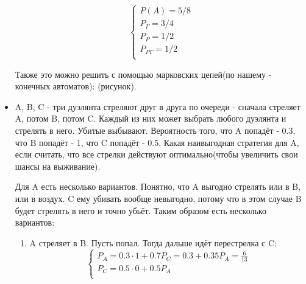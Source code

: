 \begin{itemize}
	\begin{equation*}
		\begin{cases}
			P(A) = 5/8 \\
			P_{\Gamma} = 3/4 \\
			P_P = 1/2 \\
			P_{P\Gamma} = 1/2 \\
		\end{cases}
	\end{equation*}
	
	Также это можно решить с помощью марковских цепей(по нашему - конечных автоматов): (рисунок).
	
	\item A, B, C - три дуэлянта стреляют друг в друга по очереди - сначала стреляет A, потом B, потом C. Каждый из них может выбрать любого дуэлянта и стрелять в него. Убитые выбывают. Вероятность того, что A попадёт - 0.3, что B попадёт - 1, что C попадёт - 0.5. Какая наивыгодная стратегия для A, если считать, что все стрелки действуют оптимально(чтобы увеличить свои шансы на выживание).
	
	Для A есть несколько вариантов. Понятно, что A выгодно стрелять или в B, или в воздух. C ему убивать вообще невыгодно, потому что в этом случае B будет стрелять в него и точно убьёт. Таким образом есть несколько вариантов:
	
	\begin{enumerate}
		\item A стреляет в B. Пусть попал. Тогда дальше идёт перестрелка с C: 
		\begin{equation*}
			\begin{cases}
				P_A = 0.3 \cdot 1 + 0.7 P_C = 0.3 + 0.35 P_A = \frac{6}{13} \\
				P_C = 0.5 \cdot 0 + 0.5 P_A \\
			\end{cases}
		\end{equation*}
		

\end{enumerate}
\end{itemize}
